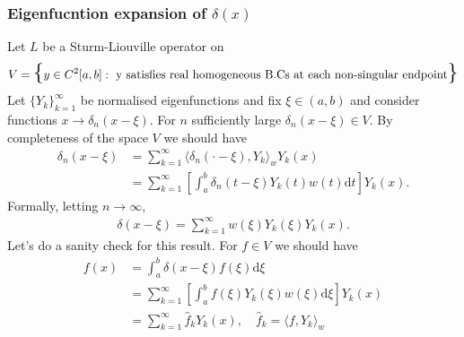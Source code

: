 \documentclass{article}
\begin{document}
\subsubsection{Eigenfucntion expansion of $ \delta(x) $}
Let $ L $ be a Sturm-Liouville operator on
\[
  V=\mathhuge\{
	  y\in C^2[a,b]: \text{ y satisfies real homogeneous B.Cs at each non-singular endpoint}
  \mathhuge\}
\]
Let $ \{Y_k\}_{k=1}^\infty $ be normalised eigenfunctions and fix $ \xi\in(a,b) $ and consider functions $ x\to \delta_n(x-\xi) $. For $ n $ sufficiently large $ \delta_n(x-\xi)\in V $. By completeness of the space $ V $ we should have
\begin{align*}
	\delta_n(x-\xi)&=\sum_{k=1}^\infty \langle \delta_n(\cdot -\xi),Y_k\rangle_wY_k(x)\\
		       &= \sum_{k=1}^\infty \left[\int_a^b\delta_n(t-\xi)Y_k(t)w(t)\mathrm dt\right]Y_k(x).
\end{align*}
Formally, letting $ n\to\infty $,
\begin{align*}
	\delta(x-\xi)=\sum_{k=1}^\infty w(\xi)Y_k(\xi)Y_k(x).
\end{align*}
Let's do a sanity check for this result. For $ f\in V $ we should have
\begin{align*}
	f(x)&=\int_a^b\delta(x-\xi)f(\xi)\mathrm d\xi\\
	    &= \sum_{k=1}^\infty\left[\int_a^bf(\xi)Y_k(\xi)w(\xi)\mathrm d\xi\right]Y_k(x)\\
	    &=\sum_{k=1}^\infty\hat f_kY_k(x),\quad \hat f_k=\langle f,Y_k\rangle_w
\end{align*}
\end{document}

